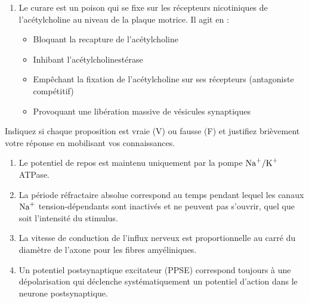 \documentclass[11pt]{article}
\begin{document}
\begin{exercice}
\begin{enumerate}
\begin{itemize}
        \item[A.] $\ce{Na+}$ tension-dépendants
        \item[B.] $\ce{K+}$ tension-dépendants
        \item[C.] $\ce{Ca^{2+}}$ tension-dépendants
        \item[D.] $\ce{Cl-}$ ligand-dépendants
    \end{itemize}
    \item Le curare est un poison qui se fixe sur les récepteurs nicotiniques de l'acétylcholine au niveau de la plaque motrice. Il agit en :
    \begin{itemize}
        \item[A.] Bloquant la recapture de l'acétylcholine
        \item[B.] Inhibant l'acétylcholinestérase
        \item[C.] Empêchant la fixation de l'acétylcholine sur ses récepteurs (antagoniste compétitif)
        \item[D.] Provoquant une libération massive de vésicules synaptiques
    \end{itemize}
\end{enumerate}
\end{exercice}

\begin{exercice}
Indiquez si chaque proposition est vraie (V) ou fausse (F) et justifiez brièvement votre réponse en mobilisant vos connaissances.
\begin{enumerate}
    \item Le potentiel de repos est maintenu uniquement par la pompe $\ce{Na+/K+}$ ATPase.
    \item La période réfractaire absolue correspond au temps pendant lequel les canaux $\ce{Na+}$ tension-dépendants sont inactivés et ne peuvent pas s'ouvrir, quel que soit l'intensité du stimulus.
    \item La vitesse de conduction de l'influx nerveux est proportionnelle au carré du diamètre de l'axone pour les fibres amyéliniques.
    \item Un potentiel postsynaptique excitateur (PPSE) correspond toujours à une dépolarisation qui déclenche systématiquement un potentiel d'action dans le neurone postsynaptique.
\end{enumerate}
\end{exercice}
\end{document}
